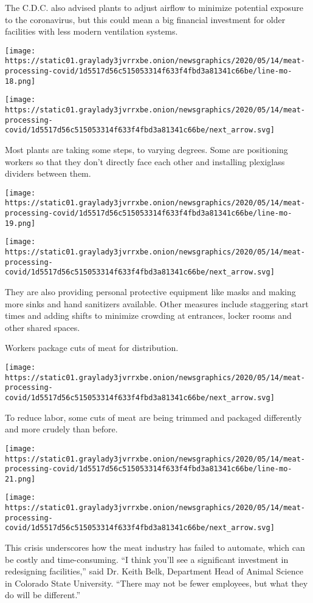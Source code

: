 The C.D.C. also advised plants to adjust airflow to minimize potential
exposure to the coronavirus, but this could mean a big financial
investment for older facilities with less modern ventilation systems.

\texttt{[image: https://static01.graylady3jvrrxbe.onion/newsgraphics/2020/05/14/meat-processing-covid/1d5517d56c515053314f633f4fbd3a81341c66be/line-mo-18.png]}

\texttt{[image: https://static01.graylady3jvrrxbe.onion/newsgraphics/2020/05/14/meat-processing-covid/1d5517d56c515053314f633f4fbd3a81341c66be/next\_arrow.svg]}

Most plants are taking some steps, to varying degrees. Some are
positioning workers so that they don't directly face each other and
installing plexiglass dividers between them.

\texttt{[image: https://static01.graylady3jvrrxbe.onion/newsgraphics/2020/05/14/meat-processing-covid/1d5517d56c515053314f633f4fbd3a81341c66be/line-mo-19.png]}

\texttt{[image: https://static01.graylady3jvrrxbe.onion/newsgraphics/2020/05/14/meat-processing-covid/1d5517d56c515053314f633f4fbd3a81341c66be/next\_arrow.svg]}

They are also providing personal protective equipment like masks and
making more sinks and hand sanitizers available. Other measures include
staggering start times and adding shifts to minimize crowding at
entrances, locker rooms and other shared spaces.

Workers package cuts of meat for distribution.

\texttt{[image: https://static01.graylady3jvrrxbe.onion/newsgraphics/2020/05/14/meat-processing-covid/1d5517d56c515053314f633f4fbd3a81341c66be/next\_arrow.svg]}

To reduce labor, some cuts of meat are being trimmed and packaged
differently and more crudely than before.

\texttt{[image: https://static01.graylady3jvrrxbe.onion/newsgraphics/2020/05/14/meat-processing-covid/1d5517d56c515053314f633f4fbd3a81341c66be/line-mo-21.png]}

\texttt{[image: https://static01.graylady3jvrrxbe.onion/newsgraphics/2020/05/14/meat-processing-covid/1d5517d56c515053314f633f4fbd3a81341c66be/next\_arrow.svg]}

This crisis underscores how the meat industry has failed to automate,
which can be costly and time-consuming. ``I think you'll see a
significant investment in redesigning facilities,'' said Dr. Keith Belk,
Department Head of Animal Science in Colorado State University. ``There
may not be fewer employees, but what they do will be different.''


